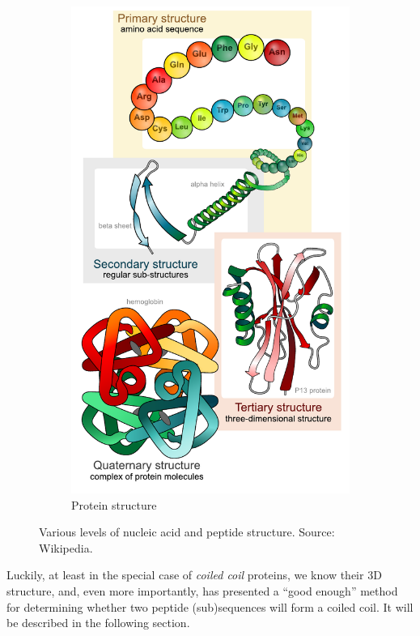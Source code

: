\documentclass[12pt,a4paper,titlepage,openany]{report}
\begin{document}
\begin{figure}[h]
\begin{subfigure}{0.34\linewidth}
		\includegraphics[width=\linewidth]{Main_protein_structure_levels_en}
		\caption{Protein structure}
		\label{fig:protein structure}
	\end{subfigure}
	\caption{Various levels of nucleic acid and peptide structure. Source: Wikipedia.}
\end{figure}

Luckily, at least in the special case of \emph{coiled coil} proteins, we know their 3D structure, and, even more importantly, \cite{potapov2015data} has presented a ``good enough'' method for determining whether two peptide (sub)sequences will form a coiled coil. It will be described in the following section.
\end{document}
